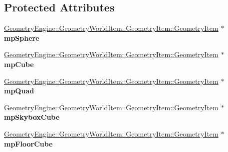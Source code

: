 \subsection*{Protected Attributes}
\begin{DoxyCompactItemize}
\item 
\mbox{\label{class_unit_test_1_1_c_translucent_shadowing_test_a318b721c1a44094a081561a274b9513a}} 
\mbox{\hyperlink{class_geometry_engine_1_1_geometry_world_item_1_1_geometry_item_1_1_geometry_item}{Geometry\+Engine\+::\+Geometry\+World\+Item\+::\+Geometry\+Item\+::\+Geometry\+Item}} $\ast$ {\bfseries mp\+Sphere}
\item 
\mbox{\label{class_unit_test_1_1_c_translucent_shadowing_test_af311a8e2bfa928ca33c8cd57c797af36}} 
\mbox{\hyperlink{class_geometry_engine_1_1_geometry_world_item_1_1_geometry_item_1_1_geometry_item}{Geometry\+Engine\+::\+Geometry\+World\+Item\+::\+Geometry\+Item\+::\+Geometry\+Item}} $\ast$ {\bfseries mp\+Cube}
\item 
\mbox{\label{class_unit_test_1_1_c_translucent_shadowing_test_aeccb4787c13c63d2cc4d27880cfe93e0}} 
\mbox{\hyperlink{class_geometry_engine_1_1_geometry_world_item_1_1_geometry_item_1_1_geometry_item}{Geometry\+Engine\+::\+Geometry\+World\+Item\+::\+Geometry\+Item\+::\+Geometry\+Item}} $\ast$ {\bfseries mp\+Quad}
\item 
\mbox{\label{class_unit_test_1_1_c_translucent_shadowing_test_a2997deb336eda638c482395afbec5119}} 
\mbox{\hyperlink{class_geometry_engine_1_1_geometry_world_item_1_1_geometry_item_1_1_geometry_item}{Geometry\+Engine\+::\+Geometry\+World\+Item\+::\+Geometry\+Item\+::\+Geometry\+Item}} $\ast$ {\bfseries mp\+Skybox\+Cube}
\item 
\mbox{\label{class_unit_test_1_1_c_translucent_shadowing_test_a3e3c6f8b524257f3498a79d140867b1c}} 
\mbox{\hyperlink{class_geometry_engine_1_1_geometry_world_item_1_1_geometry_item_1_1_geometry_item}{Geometry\+Engine\+::\+Geometry\+World\+Item\+::\+Geometry\+Item\+::\+Geometry\+Item}} $\ast$ {\bfseries mp\+Floor\+Cube}
\item 

\end{DoxyCompactItemize}
